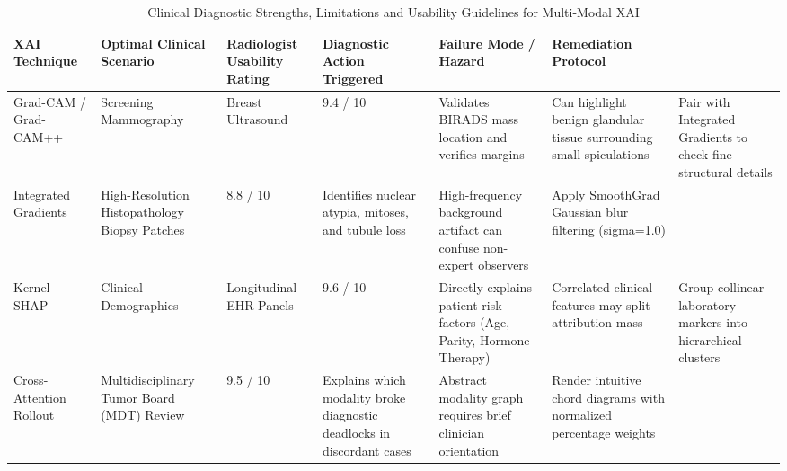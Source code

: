 \begin{table}
\caption{Clinical Diagnostic Strengths, Limitations and Usability Guidelines for Multi-Modal XAI}
\label{tab:table_5_03_02_clinical_diagnostic_strengths_and_limitations_of_xai_methods}
\begin{tabular}{llllll}
\toprule
XAI Technique & Optimal Clinical Scenario & Radiologist Usability Rating & Diagnostic Action Triggered & Failure Mode / Hazard & Remediation Protocol \\
\midrule
Grad-CAM / Grad-CAM++ & Screening Mammography & Breast Ultrasound & 9.4 / 10 & Validates BIRADS mass location and verifies margins & Can highlight benign glandular tissue surrounding small spiculations & Pair with Integrated Gradients to check fine structural details \\
Integrated Gradients & High-Resolution Histopathology Biopsy Patches & 8.8 / 10 & Identifies nuclear atypia, mitoses, and tubule loss & High-frequency background artifact can confuse non-expert observers & Apply SmoothGrad Gaussian blur filtering (sigma=1.0) \\
Kernel SHAP & Clinical Demographics & Longitudinal EHR Panels & 9.6 / 10 & Directly explains patient risk factors (Age, Parity, Hormone Therapy) & Correlated clinical features may split attribution mass & Group collinear laboratory markers into hierarchical clusters \\
Cross-Attention Rollout & Multidisciplinary Tumor Board (MDT) Review & 9.5 / 10 & Explains which modality broke diagnostic deadlocks in discordant cases & Abstract modality graph requires brief clinician orientation & Render intuitive chord diagrams with normalized percentage weights \\
\bottomrule
\end{tabular}
\end{table}
